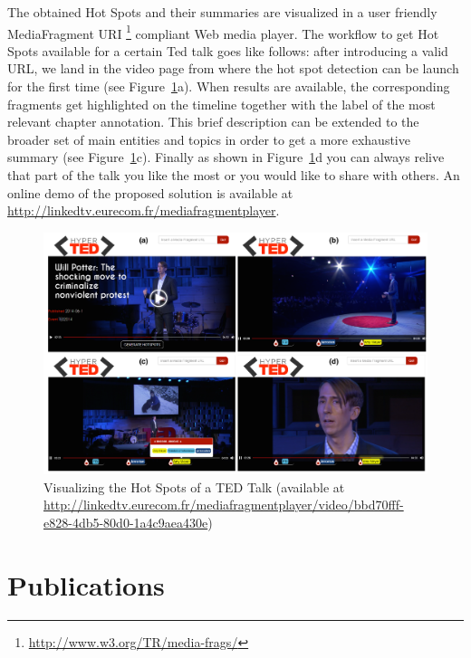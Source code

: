 \documentclass[a4paper,11pt]{report}
\begin{document}
The obtained Hot Spots and their summaries are visualized in a user friendly MediaFragment URI \footnote{\fontsize{8pt}{1em}\selectfont \url{http://www.w3.org/TR/media-frags/}} compliant Web media player. The workflow to get Hot Spots available for a certain Ted talk goes like follows: after introducing a valid URL, we land in the video page from where the hot spot detection can be launch for the first time (see Figure~\ref{fig:demoScreenShots}a). When results are available, the corresponding fragments get highlighted on the timeline together with the label of the most relevant chapter annotation. This brief description can be extended to the broader set of main entities and topics in order to get a more exhaustive summary (see Figure~\ref{fig:demoScreenShots}c). Finally as shown in Figure~\ref{fig:demoScreenShots}d you can always relive that part of the talk you like the most or you would like to share with others. An online demo of the proposed solution is available at \url{http://linkedtv.eurecom.fr/mediafragmentplayer}.

\begin{figure}[h!]
\centering
\includegraphics[width=1\textwidth]{figure/Ted_U}
\caption{Visualizing the Hot Spots of a TED Talk (available at \fontsize{8pt}{1em}\selectfont \protect\url{http://linkedtv.eurecom.fr/mediafragmentplayer/video/bbd70fff-e828-4db5-80d0-1a4c9aea430e})}
\label{fig:demoScreenShots}%
\end{figure}



\chapter*{Publications}
\label{sec:publications}
\ifpdf
    \graphicspath{{Chapter2/Chapter2Figs/PNG/}{Chapter2/Chapter2Figs/PDF/}{Chapter2/Chapter2Figs/}}
\else
    \graphicspath{{Chapter2/Chapter2Figs/EPS/}{Chapter2/Chapter2Figs/}}
\fi
\end{document}
